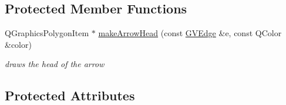 \subsection*{\-Protected \-Member \-Functions}
\begin{DoxyCompactItemize}
\item 
\-Q\-Graphics\-Polygon\-Item $\ast$ \hyperlink{class_g_action_afeb408bf85d902191cef8a3cf613c7eb}{make\-Arrow\-Head} (const \hyperlink{struct_g_v_edge}{\-G\-V\-Edge} \&e, const \-Q\-Color \&color)
\begin{DoxyCompactList}\small\item\em draws the head of the arrow \end{DoxyCompactList}\end{DoxyCompactItemize}
\subsection*{\-Protected \-Attributes}
